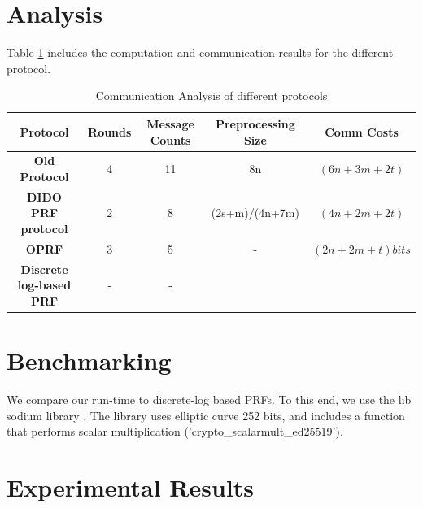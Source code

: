 \section{Analysis}

Table \ref{CommunicationCosts} includes the computation and communication results for the different protocol.

\begin{table}[htbp]
	\label{CommunicationCosts}
	\begin{center}
		\begin{tabular}{|c|c|c|c|c|}
			\hline
			\textbf{Protocol} & \textbf{Rounds}  & \textbf{Message Counts} &  \textbf{Preprocessing Size} & \textbf{Comm Costs}  \\
			\hline
			\hline
			\textbf{Old Protocol}  & 4  & 11 & 8n & $(6n+3m+2t)$ \\
			\hline
			\textbf{DIDO PRF protocol} & 2	& 8 & (2s+m)/(4n+7m) & $(4n+2m+2t)$  	\\
			\hline
			\textbf{OPRF} & 3 & 5 & - &  $(2n+2m+t) bits$	\\
			\hline
			\textbf{Discrete log-based PRF} &  - & - &  & \\
			\hline
			
		\end{tabular}
		
		\vspace{-1mm}
		\caption{Communication Analysis of different protocols}
		\label{CommunicationCosts}
	\end{center}
	\vspace{-5mm}
\end{table}


\section{Benchmarking}

We compare our run-time to discrete-log based PRFs. To this end, we use the lib sodium library \cite{LibSodium}. The library uses elliptic curve 252 bits, and includes a function that performs scalar multiplication ('crypto\_scalarmult\_ed25519').


\section{Experimental Results}

